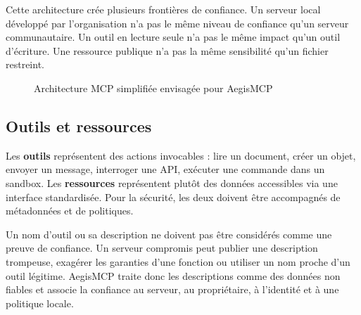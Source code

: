 Cette architecture crée plusieurs frontières de confiance. Un serveur local développé par l'organisation n'a pas le même niveau de confiance qu'un serveur communautaire. Un outil en lecture seule n'a pas le même impact qu'un outil d'écriture. Une ressource publique n'a pas la même sensibilité qu'un fichier restreint.

\begin{figure}[H]
\centering
{}
\caption{Architecture MCP simplifiée envisagée pour AegisMCP}
\label{fig:mcp-architecture}
\end{figure}

\subsection{Outils et ressources}

Les \textbf{outils} représentent des actions invocables : lire un document, créer un objet, envoyer un message, interroger une API, exécuter une commande dans un sandbox. Les \textbf{ressources} représentent plutôt des données accessibles via une interface standardisée. Pour la sécurité, les deux doivent être accompagnés de métadonnées et de politiques.

Un nom d'outil ou sa description ne doivent pas être considérés comme une preuve de confiance. Un serveur compromis peut publier une description trompeuse, exagérer les garanties d'une fonction ou utiliser un nom proche d'un outil légitime. AegisMCP traite donc les descriptions comme des données non fiables et associe la confiance au serveur, au propriétaire, à l'identité et à une politique locale.

